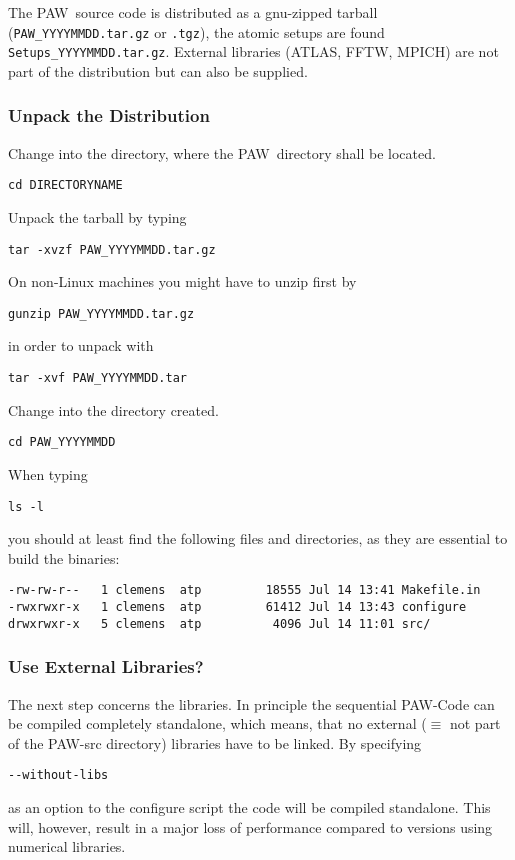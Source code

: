\documentclass[a4paper,10pt]{article}
\newcommand{\PAW}{\textsc{PAW}}
\begin{document}
The \PAW\ source code is distributed as a gnu-zipped tarball
(\texttt{PAW\_YYYYMMDD.tar.gz} or \texttt{.tgz}), the atomic setups are found
\texttt{Setups\_YYYYMMDD.tar.gz}.  External libraries (ATLAS, FFTW, MPICH) are
not part of the distribution but can also be supplied.

\subsubsection*{Unpack the Distribution}
Change into the directory, where the \PAW\ directory shall be located. 
\begin{verbatim}
cd DIRECTORYNAME
\end{verbatim}
 Unpack the tarball by typing
\begin{verbatim}
tar -xvzf PAW_YYYYMMDD.tar.gz
\end{verbatim}
On non-Linux machines you might have to unzip first by
\begin{verbatim}
gunzip PAW_YYYYMMDD.tar.gz
\end{verbatim}
in order to unpack with
\begin{verbatim}
tar -xvf PAW_YYYYMMDD.tar
\end{verbatim}
Change into the directory created.
\begin{verbatim}
cd PAW_YYYYMMDD
\end{verbatim}
When typing
\begin{verbatim}
ls -l
\end{verbatim}
you should at least find the following files and directories, as they are essential to build the binaries:
\begin{verbatim}
-rw-rw-r--   1 clemens  atp         18555 Jul 14 13:41 Makefile.in
-rwxrwxr-x   1 clemens  atp         61412 Jul 14 13:43 configure
drwxrwxr-x   5 clemens  atp          4096 Jul 14 11:01 src/
\end{verbatim}

\subsubsection*{Use External Libraries?}
The next step concerns the libraries.  In principle the sequential \PAW-Code can be
compiled completely standalone, which means, that no external ($\equiv$ not
part of the \PAW-src directory) libraries have to be linked.  By specifying
\begin{verbatim}
--without-libs
\end{verbatim}
as an option to the configure script the code will be compiled standalone.
This will, however, result in a major loss of performance compared to versions
using numerical libraries.
\end{document}
